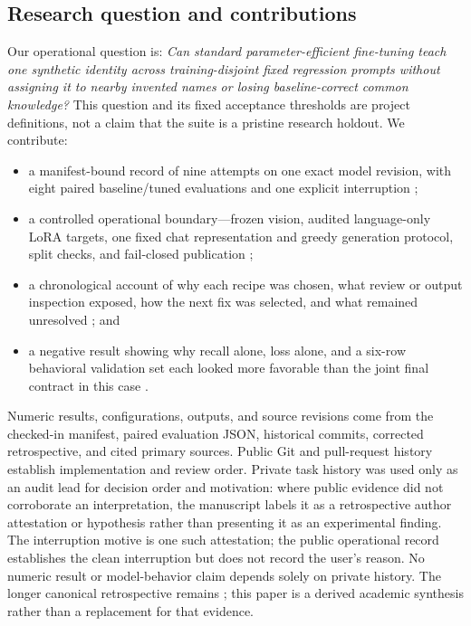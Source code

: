 

\subsection{Research question and contributions}

Our operational question is: \emph{Can standard parameter-efficient
fine-tuning teach one synthetic identity across training-disjoint fixed
regression prompts without assigning it to nearby invented names or losing
baseline-correct common knowledge?} This question and its fixed acceptance
thresholds are project definitions, not a claim that the suite is a pristine
research holdout. 
We contribute:

\begin{itemize}
  \item a manifest-bound record of nine attempts on one exact model revision,
  with eight paired baseline/tuned evaluations and one explicit interruption
  ;
  \item a controlled operational boundary---frozen vision, audited
  language-only LoRA targets, one fixed chat representation and greedy
  generation protocol, split checks, and fail-closed publication
  ;
  \item a chronological account of why each recipe was chosen, what review or
  output inspection exposed, how the next fix was selected, and what remained
  unresolved %
  ; and
  \item a negative result showing why recall alone, loss alone, and a six-row
  behavioral validation set each looked more favorable than the joint final
  contract in this case .
\end{itemize}

Numeric results, configurations, outputs, and source revisions come from the
checked-in manifest, paired evaluation JSON, historical commits, corrected
retrospective, and cited primary sources. Public Git and pull-request history
establish implementation and review order. Private task history was used only
as an audit lead for decision order and motivation: where public evidence did
not corroborate an interpretation, the manuscript labels it as a retrospective
author attestation or hypothesis rather than presenting it as an experimental
finding. The interruption motive is one such attestation; the public operational
record establishes the clean interruption but does not record the user's
reason. No numeric result or model-behavior claim depends solely on private
history. The longer canonical retrospective remains
; this paper is
a derived academic synthesis rather than a replacement for that evidence.
